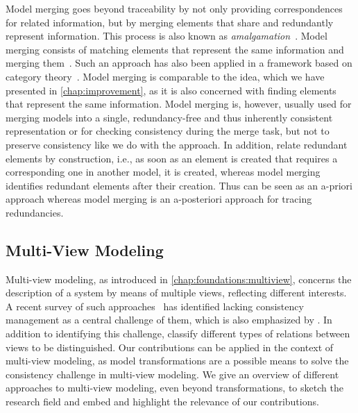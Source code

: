 Model merging goes beyond traceability by not only providing correspondences for related information, but by merging elements that share and redundantly represent information.
This process is also known as \emph{amalgamation}~\cite{koenig2017efficientConsistencyChecking-ECMFA}.
Model merging consists of matching elements that represent the same information and merging them~\cite{koenig2017efficientConsistencyChecking-ECMFA}.
Such an approach has also been applied in a framework based on category theory~\cite{diskin2010overlapsHeterogeneous-MDI}.
Model merging is comparable to the \commonalities idea, which we have presented in \autoref{chap:improvement}, as it is also concerned with finding elements that represent the same information. 
Model merging is, however, usually used for merging models into a single, redundancy-free and thus inherently consistent representation or for checking consistency during the merge task, but not to preserve consistency like we do with the \commonalities approach.
In addition, \commonalities relate redundant elements by construction, i.e., as soon as an element is created that requires a corresponding one in another model, it is created, whereas model merging identifies redundant elements after their creation. Thus \commonalities can be seen as an a-priori approach whereas model merging is an a-posteriori approach for tracing redundancies.


\subsection{Multi-View Modeling}

Multi-view modeling, as introduced in \autoref{chap:foundations:multiview}, concerns the description of a system by means of multiple views, reflecting different interests.
A recent survey of such approaches~\cite{cicchetti2019multiview-SoSym} has identified lacking consistency management as a central challenge of them, which is also emphasized by \textcite{reineke2019ProblemMultiView-SoSym}.
In addition to identifying this challenge, \textcite{persson2013characterizationMultiView-EMSOFT} classify different types of relations between views to be distinguished.
Our contributions can be applied in the context of multi-view modeling, as model transformations are a possible means to solve the consistency challenge in multi-view modeling.
We give an overview of different approaches to multi-view modeling, even beyond transformations, to sketch the research field and embed and highlight the relevance of our contributions.

